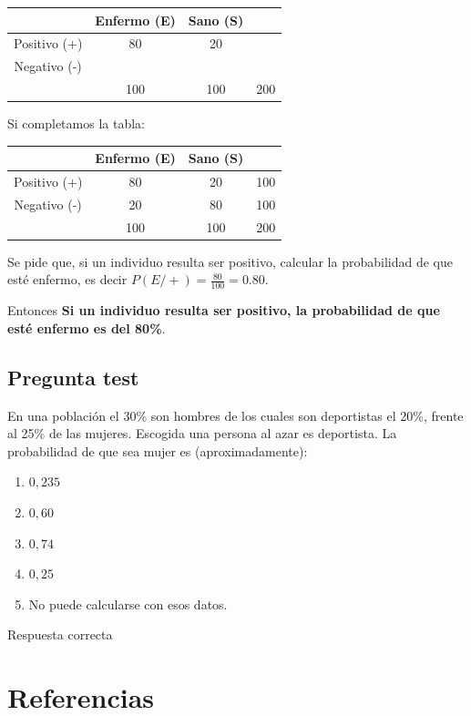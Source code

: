 \documentclass[
]{book}
\providecommand{\tightlist}{%
  \setlength{\itemsep}{0pt}\setlength{\parskip}{0pt}}
\begin{document}
\begin{longtable}[]{@{}cccc@{}}
\toprule
& Enfermo (E) & Sano (S) &\tabularnewline
\midrule
\endhead
Positivo (+) & 80 & 20 &\tabularnewline
Negativo (-) & & &\tabularnewline
& 100 & 100 & 200\tabularnewline
\bottomrule
\end{longtable}

Si completamos la tabla:

\begin{longtable}[]{@{}cccc@{}}
\toprule
& Enfermo (E) & Sano (S) &\tabularnewline
\midrule
\endhead
Positivo (+) & 80 & 20 & 100\tabularnewline
Negativo (-) & 20 & 80 & 100\tabularnewline
& 100 & 100 & 200\tabularnewline
\bottomrule
\end{longtable}

Se pide que, si un individuo resulta ser positivo, calcular la probabilidad de que esté enfermo, es decir \(P(E/+)= \frac{80}{100}=0.80\).

Entonces \textbf{Si un individuo resulta ser positivo, la probabilidad de que esté enfermo es del 80\%}.

\hypertarget{pregunta-test-184}{%
\section{Pregunta test}\label{pregunta-test-184}}

En una población el 30\% son hombres de los cuales son deportistas el 20\%, frente al 25\% de las mujeres. Escogida una persona al azar es deportista. La probabilidad de que sea mujer es (aproximadamente):

\begin{enumerate}
\def\labelenumi{\alph{enumi})}
\tightlist
\item
  \(0,235\)
\item
  \(0,60\)
\item
  \(0,74\)
\item
  \(0,25\)
\item
  No puede calcularse con esos datos.
\end{enumerate}

Respuesta correcta

\hypertarget{referencias}{%
\chapter{Referencias}\label{referencias}}
\end{document}
